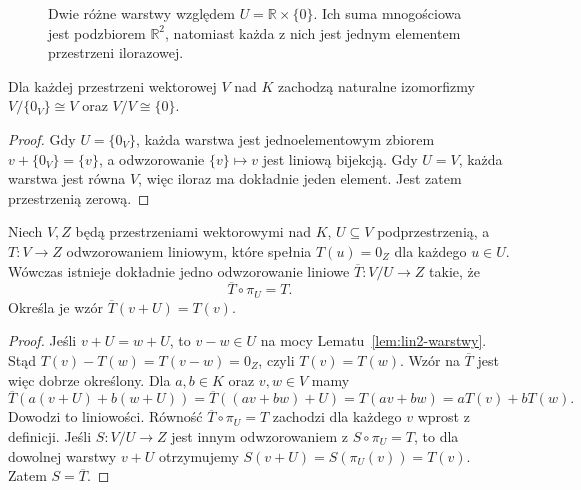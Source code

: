 \begin{figure}[!htbp]
\centering
{}
\caption{Dwie różne warstwy względem
\(U=\mathbb R\times\{0\}\). Ich suma
mnogościowa jest podzbiorem \(\mathbb R^2\),
natomiast każda z nich jest jednym
elementem przestrzeni ilorazowej.}
\label{fig:lin2-warstwy-r2}
\end{figure}

\begin{stwierdzenie}
\label{prop:lin2-iloraz-przypadki}
Dla każdej przestrzeni wektorowej \(V\) nad \(K\)
zachodzą naturalne izomorfizmy
\(V/\{0_V\}\cong V\) oraz \(V/V\cong\{0\}\).
\end{stwierdzenie}
\begin{proof}
Gdy \(U=\{0_V\}\), każda warstwa jest
jednoelementowym zbiorem \(v+\{0_V\}=\{v\}\),
a odwzorowanie \(\{v\}\mapsto v\)
jest liniową bijekcją.
Gdy \(U=V\), każda warstwa jest równa \(V\),
więc iloraz ma dokładnie jeden element.
Jest zatem przestrzenią zerową.
\end{proof}

\begin{twierdzenie}
\label{thm:lin2-wlasnosc-ilorazu}
Niech \(V,Z\) będą przestrzeniami wektorowymi
nad \(K\), \(U\subseteq V\) podprzestrzenią,
a \(T\colon V\to Z\) odwzorowaniem liniowym,
które spełnia \(T(u)=0_Z\) dla każdego \(u\in U\).
Wówczas istnieje dokładnie jedno odwzorowanie
liniowe \(\overline T\colon V/U\to Z\) takie, że
\[
 \overline T\circ\pi_U=T.
\]
Określa je wzór \(\overline T(v+U)=T(v)\).
\end{twierdzenie}
\begin{proof}
Jeśli \(v+U=w+U\), to
\(v-w\in U\) na mocy
Lematu~\ref{lem:lin2-warstwy}.
Stąd
\(T(v)-T(w)=T(v-w)=0_Z\),
czyli \(T(v)=T(w)\).
Wzór na \(\overline T\) jest więc
dobrze określony.
Dla \(a,b\in K\) oraz \(v,w\in V\)
mamy
\[
 \overline T(a(v+U)+b(w+U))
 =\overline T((av+bw)+U)
 =T(av+bw)
 =aT(v)+bT(w).
\]
Dowodzi to liniowości.
Równość \(\overline T\circ\pi_U=T\)
zachodzi dla każdego \(v\) wprost
z definicji.
Jeśli \(S\colon V/U\to Z\) jest innym
odwzorowaniem z \(S\circ\pi_U=T\),
to dla dowolnej warstwy \(v+U\)
otrzymujemy \(S(v+U)=S(\pi_U(v))=T(v)\).
Zatem \(S=\overline T\).
\end{proof}

